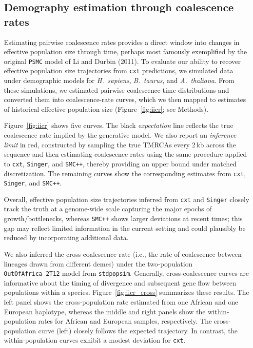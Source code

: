 \documentclass{article}
\newcommand{\cxtkit}{\texttt{cxt}\xspace}
\newcommand{\stdpopsim}{\texttt{stdpopsim}\xspace}
\newcommand{\singer}{\texttt{Singer}\xspace}
\newcommand{\smcpp}{\texttt{SMC++}\xspace}
\begin{document}
\subsection*{Demography estimation through coalescence rates}



Estimating pairwise coalescence rates provides a direct window into changes in effective population size through time,
perhaps most famously exemplified by the original \texttt{PSMC} model of Li and Durbin (2011). 
To evaluate our ability to recover effective population size trajectories from \cxtkit predictions, 
we simulated data under demographic models for \emph{H.~sapiens}, \emph{B.~taurus}, and \emph{A.~thaliana}. From these simulations, we estimated pairwise coalescence-time distributions 
and converted them into coalescence-rate curves,
which we then mapped to estimates of historical effective population size (Figure~\ref{fig:iicr}; see Methods).

Figure~\ref{fig:iicr} shows five curves.
The black \emph{expectation} line reflects the true coalescence rate implied by the generative model.
We also report an \emph{inference limit} in red, constructed by sampling the true TMRCAs every 2\,kb across the sequence
and then estimating coalescence rates using the same procedure applied to \cxtkit, \singer, and \smcpp,
thereby providing an upper bound under matched discretization.
The remaining curves show the corresponding estimates from \cxtkit, \singer, and \smcpp.

Overall, effective population size trajectories inferred from \cxtkit and \singer
closely track the truth at a genome-wide scale capturing the major epochs of growth/bottlenecks,
whereas \smcpp shows larger deviations at recent times;
this gap may reflect limited information in the current setting
and could plausibly be reduced by incorporating additional data.

We also inferred the cross‐coalescence rate (i.e., the rate of coalescence between lineages drawn from different demes) 
under the two‐population \texttt{OutOfAfrica\_2T12} model from \stdpopsim.
Generally, cross-coalescence curves are informative about the timing of divergence 
and subsequent gene flow between populations within a species.
Figure~\ref{fig:iicr_cross} summarizes these results.
The left panel shows the cross‐population rate estimated from one African and one European haplotype, 
whereas the middle  and right panels show the within‐population rates for African and European samples, respectively.
The cross-population curve (left) closely follows the expected trajectory.
In contrast, the within-population curves exhibit a modest deviation for \cxtkit.
\end{document}
